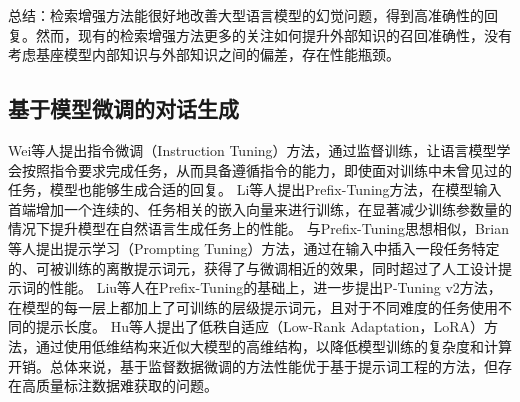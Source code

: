 总结：检索增强方法能很好地改善大型语言模型的幻觉问题，得到高准确性的回复。然而，现有的检索增强方法更多的关注如何提升外部知识的召回准确性，没有考虑基座模型内部知识与外部知识之间的偏差，存在性能瓶颈。

\subsection{基于模型微调的对话生成}

Wei等人\cite{DBLP:conf/iclr/WeiBZGYLDDL22}提出指令微调（Instruction Tuning）方法，通过监督训练，让语言模型学会按照指令要求完成任务，从而具备遵循指令的能力，即使面对训练中未曾见过的任务，模型也能够生成合适的回复。
Li等人\cite{DBLP:conf/acl/LiL20}提出Prefix-Tuning方法，在模型输入首端增加一个连续的、任务相关的嵌入向量来进行训练，在显著减少训练参数量的情况下提升模型在自然语言生成任务上的性能。
与Prefix-Tuning思想相似，Brian等人\cite{lester-etal-2021-power}提出提示学习（Prompting Tuning）方法，通过在输入中插入一段任务特定的、可被训练的离散提示词元，获得了与微调相近的效果，同时超过了人工设计提示词的性能。
Liu等人\cite{DBLP:journals/corr/abs-2110-07602}在Prefix-Tuning的基础上，进一步提出P-Tuning v2方法，在模型的每一层上都加上了可训练的层级提示词元，且对于不同难度的任务使用不同的提示长度。
Hu等人\cite{DBLP:conf/iclr/HuSWALWWC22}提出了低秩自适应（Low-Rank Adaptation，LoRA）方法，通过使用低维结构来近似大模型的高维结构，以降低模型训练的复杂度和计算开销。总体来说，基于监督数据微调的方法性能优于基于提示词工程的方法，但存在高质量标注数据难获取的问题。

